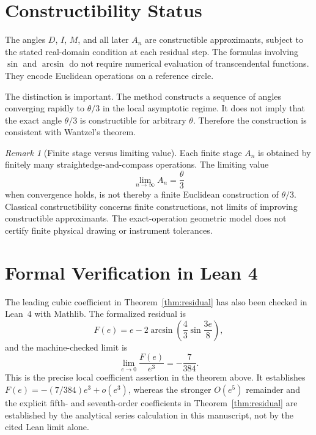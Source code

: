 \documentclass[11pt]{article}
\theoremstyle{remark}
\newtheorem{remark}{Remark}
\begin{document}
\section{Constructibility Status}

The angles $D$, $I$, $M$, and all later $A_n$ are constructible approximants, subject to
the stated real-domain condition at each residual step.  The formulas involving $\sin$ and
$\arcsin$ do not require numerical evaluation of transcendental functions.  They encode
Euclidean operations on a reference circle.

The distinction is important.  The method constructs a sequence of angles converging
rapidly to $\theta/3$ in the local asymptotic regime.  It does not imply that the exact
angle $\theta/3$ is constructible for arbitrary $\theta$.  Therefore the construction is
consistent with Wantzel's theorem.

\begin{remark}[Finite stage versus limiting value]
Each finite stage $A_n$ is obtained by finitely many straightedge-and-compass operations.
The limiting value
\[
\lim_{n\to\infty}A_n
=
\frac{\theta}{3}
\]
when convergence holds, is not thereby a finite Euclidean construction of $\theta/3$.
Classical constructibility concerns finite constructions, not limits of improving
constructible approximants.  The exact-operation geometric model does not certify
finite physical drawing or instrument tolerances.
\end{remark}

\section{Formal Verification in Lean 4}\label{sec:lean}

The leading cubic coefficient in Theorem~\ref{thm:residual} has also been checked in
Lean~4 with Mathlib.  The formalized residual is
\[
F(e)=e-2\arcsin\!\left(\frac43\sin\frac{3e}{8}\right),
\]
and the machine-checked limit is
\begin{equation}\label{eq:lean-cubic}
\lim_{e\to0}\frac{F(e)}{e^3}=-\frac7{384}.
\end{equation}
This is the precise local coefficient assertion in the theorem above.
It establishes $F(e)=-(7/384)e^3+o(e^3)$, whereas the stronger
$O(e^5)$ remainder and the explicit fifth- and seventh-order coefficients
in Theorem~\ref{thm:residual} are established by the analytical series
calculation in this manuscript, not by the cited Lean limit alone.
\end{document}
